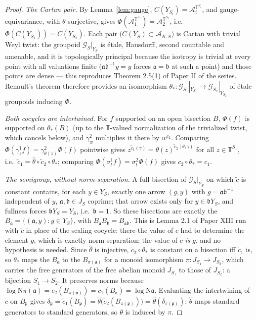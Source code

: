 \documentclass[11pt]{amsart}
\numberwithin{equation}{section}
\theoremstyle{definition}
\theoremstyle{remark}
\newcommand{\T}{\mathbb{T}}
\newcommand{\cA}{\mathcal{A}}
\newcommand{\cG}{\mathcal{G}}
\newcommand{\pp}{\mathfrak{p}}
\newcommand{\aaa}{\mathfrak{a}}
\newcommand{\bb}{\mathfrak{b}}
\newcommand{\Ns}{\mathrm{N}}
\begin{document}
\begin{proof}
\emph{The Cartan pair.} By Lemma~\ref{lem:gauge}, $C(Y_{S_i})=\cA_i^{\T^{S_i}}$, and
gauge-equivariance, with $\theta$ surjective, gives
$\Phi(\cA_1^{\T^{S_1}})=\cA_2^{\T^{S_2}}$, i.e.\ $\Phi(C(Y_{S_1}))=C(Y_{S_2})$. Each pair
$\bigl(C(Y_S)\subset\cA_{K,S}\bigr)$ is Cartan with trivial Weyl twist: the groupoid
$\cG_S|_{Y_S}$ is \'etale, Hausdorff, second countable and amenable, and it is
topologically principal because the isotropy is trivial at every point with all valuations
finite ($\aaa\bb^{-1}y=y$ forces $\aaa=\bb$ at such a point) and those points are dense ---
this reproduces Theorem 2.5(1) of Paper II of the series. Renault's theorem \cite{Renault}
therefore provides an isomorphism $\theta_*:\cG_{S_1}|_{Y_{S_1}}\to\cG_{S_2}|_{Y_{S_2}}$ of
\'etale groupoids inducing $\Phi$.

\emph{Both cocycles are intertwined.} For $f$ supported on an open bisection $B$, $\Phi(f)$
is supported on $\theta_*(B)$ (up to the $\T$-valued normalization of the trivialized
twist, which cancels below), and $\gamma^2_w$ multiplies it there by $w^{\widetilde
c_2}$. Comparing $\Phi(\gamma^1_z f)=\gamma^2_{\theta(z)}\Phi(f)$ pointwise gives
$z^{\widetilde c_1(\gamma)}=\theta(z)^{\widetilde c_2(\theta_*\gamma)}$ for all
$z\in\T^{S_1}$, i.e.\ $\widetilde c_1=\widehat\theta\circ\widetilde c_2\circ\theta_*$;
comparing $\Phi(\sigma^1_t f)=\sigma^2_t\Phi(f)$ gives $c_2\circ\theta_*=c_1$.

\emph{The semigroup, without norm-separation.} A full bisection of $\cG_S|_{Y_S}$ on which
$\widetilde c$ is constant contains, for each $y\in Y_S$, exactly one arrow $(g,y)$ with
$g=\aaa\bb^{-1}$ independent of $y$, $\aaa,\bb\in J_S$ coprime; that arrow exists only for
$y\in\bb Y_S$, and fullness forces $\bb Y_S=Y_S$, i.e.\ $\bb=1$. So these bisections are
exactly the $B_\aaa=\{(\aaa,y):y\in Y_S\}$, with $B_\aaa B_\bb=B_{\aaa\bb}$. This is
Lemma 2.1 of Paper XIII run with $\widetilde c$ in place of the scaling cocycle: there the
value of $c$ had to determine the element $g$, which is exactly norm-separation; the value
of $\widetilde c$ \emph{is} $g$, and no hypothesis is needed. Since $\widehat\theta$ is
injective, $\widetilde c_2\circ\theta_*$ is constant on a bisection iff $\widetilde c_1$
is, so $\theta_*$ maps the $B_\aaa$ to the $B_{\pi(\aaa)}$ for a monoid isomorphism
$\pi:J_{S_1}\to J_{S_2}$, which carries the free generators of the free abelian monoid
$J_{S_1}$ to those of $J_{S_2}$: a bijection $S_1\to S_2$. It preserves norms because
$\log\Ns\pi(\aaa)=c_2(B_{\pi(\aaa)})=c_1(B_\aaa)=\log\Ns\aaa$. Evaluating the intertwining
of $\widetilde c$ on $B_\pp$ gives
$\delta_\pp=\widetilde c_1(B_\pp)=\widehat\theta\bigl(\widetilde
c_2(B_{\pi(\pp)})\bigr)=\widehat\theta(\delta_{\pi(\pp)})$: $\widehat\theta$ maps standard
generators to standard generators, so $\theta$ is induced by $\pi$.


\end{proof}
\end{document}
